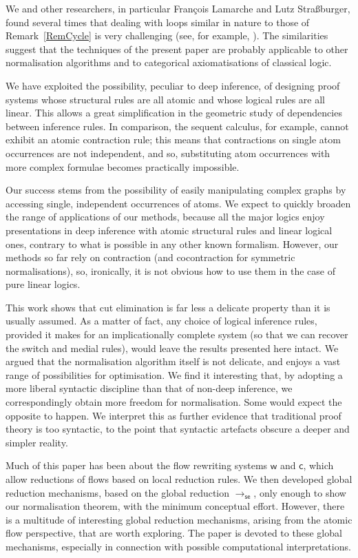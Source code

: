\documentclass[a4paper]{LMCS}
\begin{document}
We and other researchers, in particular Fran\c{c}ois Lamarche and Lutz Stra{\ss}burger, found several times that dealing with loops similar in nature to those of Remark~\ref{RemCycle} is very challenging (see, for example, \cite{GuglStra:02:A-Non-co:dq,LamaStra:05:Construc:qq,LamaStra:05:Naming-P:ov,Stra:06:On-the-A:jy}). The similarities suggest that the techniques of the present paper are probably applicable to other normalisation algorithms and to categorical axiomatisations of classical logic.

We have exploited the possibility, peculiar to deep inference, of designing proof systems whose structural rules are all atomic and whose logical rules are all linear. This allows a great simplification in the geometric study of dependencies between inference rules. In comparison, the sequent calculus, for example, cannot exhibit an atomic contraction rule; this means that contractions on single atom occurrences are not independent, and so, substituting atom occurrences with more complex formulae becomes practically impossible.

Our success stems from the possibility of easily manipulating complex graphs by accessing single, independent occurrences of atoms. We expect to quickly broaden the range of applications of our methods, because all the major logics enjoy presentations in deep inference with atomic structural rules and linear logical ones, contrary to what is possible in any other known formalism. However, our methods so far rely on contraction (and cocontraction for symmetric normalisations), so, ironically, it is not obvious how to use them in the case of pure linear logics.

This work shows that cut elimination is far less a delicate property than it is usually assumed. As a matter of fact, any choice of logical inference rules, provided it makes for an implicationally complete system (so that we can recover the switch and medial rules), would leave the results presented here intact. We argued that the normalisation algorithm itself is not delicate, and enjoys a vast range of possibilities for optimisation. We find it interesting that, by adopting a more liberal syntactic discipline than that of non-deep inference, we correspondingly obtain more freedom for normalisation. Some would expect the opposite to happen. We interpret this as further evidence that traditional proof theory is too syntactic, to the point that syntactic artefacts obscure a deeper and simpler reality. 

Much of this paper has been about the flow rewriting systems ${{\mathsf w}}$ and ${{\mathsf c}}$, which allow reductions of flows based on local reduction rules. We then developed global reduction mechanisms, based on the global reduction $\to_{{\mathsf{se}}}$, only enough to show our normalisation theorem, with the minimum conceptual effort. However, there is a multitude of interesting global reduction mechanisms, arising from the atomic flow perspective, that are worth exploring. The paper \cite{GuglGund:08:Normalis:yu} is devoted to these global mechanisms, especially in connection with possible computational interpretations.
\end{document}
